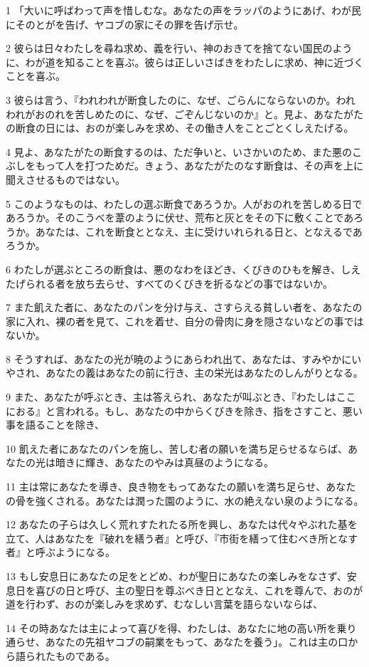 \par 1 「大いに呼ばわって声を惜しむな。あなたの声をラッパのようにあげ、わが民にそのとがを告げ、ヤコブの家にその罪を告げ示せ。
\par 2 彼らは日々わたしを尋ね求め、義を行い、神のおきてを捨てない国民のように、わが道を知ることを喜ぶ。彼らは正しいさばきをわたしに求め、神に近づくことを喜ぶ。
\par 3 彼らは言う、『われわれが断食したのに、なぜ、ごらんにならないのか。われわれがおのれを苦しめたのに、なぜ、ごぞんじないのか』と。見よ、あなたがたの断食の日には、おのが楽しみを求め、その働き人をことごとくしえたげる。
\par 4 見よ、あなたがたの断食するのは、ただ争いと、いさかいのため、また悪のこぶしをもって人を打つためだ。きょう、あなたがたのなす断食は、その声を上に聞えさせるものではない。
\par 5 このようなものは、わたしの選ぶ断食であろうか。人がおのれを苦しめる日であろうか。そのこうべを葦のように伏せ、荒布と灰とをその下に敷くことであろうか。あなたは、これを断食ととなえ、主に受けいれられる日と、となえるであろうか。
\par 6 わたしが選ぶところの断食は、悪のなわをほどき、くびきのひもを解き、しえたげられる者を放ち去らせ、すべてのくびきを折るなどの事ではないか。
\par 7 また飢えた者に、あなたのパンを分け与え、さすらえる貧しい者を、あなたの家に入れ、裸の者を見て、これを着せ、自分の骨肉に身を隠さないなどの事ではないか。
\par 8 そうすれば、あなたの光が暁のようにあらわれ出て、あなたは、すみやかにいやされ、あなたの義はあなたの前に行き、主の栄光はあなたのしんがりとなる。
\par 9 また、あなたが呼ぶとき、主は答えられ、あなたが叫ぶとき、『わたしはここにおる』と言われる。もし、あなたの中からくびきを除き、指をさすこと、悪い事を語ることを除き、
\par 10 飢えた者にあなたのパンを施し、苦しむ者の願いを満ち足らせるならば、あなたの光は暗きに輝き、あなたのやみは真昼のようになる。
\par 11 主は常にあなたを導き、良き物をもってあなたの願いを満ち足らせ、あなたの骨を強くされる。あなたは潤った園のように、水の絶えない泉のようになる。
\par 12 あなたの子らは久しく荒れすたれたる所を興し、あなたは代々やぶれた基を立て、人はあなたを『破れを繕う者』と呼び、『市街を繕って住むべき所となす者』と呼ぶようになる。
\par 13 もし安息日にあなたの足をとどめ、わが聖日にあなたの楽しみをなさず、安息日を喜びの日と呼び、主の聖日を尊ぶべき日ととなえ、これを尊んで、おのが道を行わず、おのが楽しみを求めず、むなしい言葉を語らないならば、
\par 14 その時あなたは主によって喜びを得、わたしは、あなたに地の高い所を乗り通らせ、あなたの先祖ヤコブの嗣業をもって、あなたを養う」。これは主の口から語られたものである。

